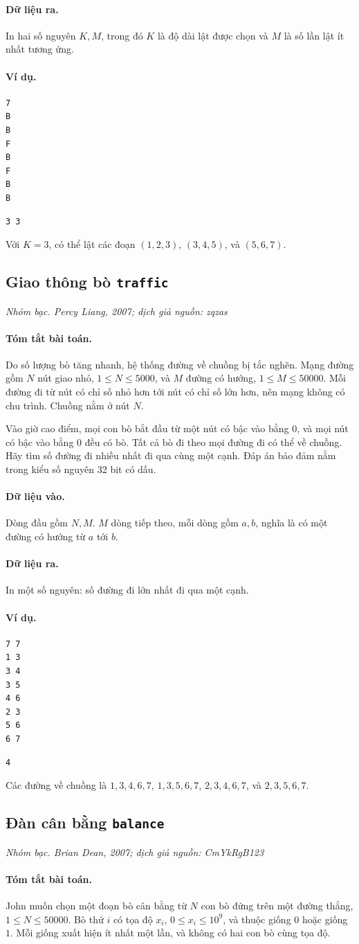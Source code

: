\documentclass[11pt]{article}
\newcommand{\problem}[4]{%
  \subsection[#1 (#2)]{#1 \hfill {\normalsize\texttt{#2}}}%
  \noindent\textit{#3. #4}\par\smallskip
}
\newcommand{\iosec}[1]{\paragraph{#1}}
\begin{document}
\iosec{Dữ liệu ra.}
In hai số nguyên \(K,M\), trong đó \(K\) là độ dài lật được chọn và \(M\) là
số lần lật ít nhất tương ứng.

\iosec{Ví dụ.}
\begin{verbatim}
7
B
B
F
B
F
B
B
\end{verbatim}

\begin{verbatim}
3 3
\end{verbatim}

Với \(K=3\), có thể lật các đoạn \((1,2,3)\), \((3,4,5)\), và \((5,6,7)\).

\problem{Giao thông bò}{traffic}{Nhóm bạc}{Percy Liang, 2007; dịch giả nguồn: zqzas}

\iosec{Tóm tắt bài toán.}
Do số lượng bò tăng nhanh, hệ thống đường về chuồng bị tắc nghẽn. Mạng đường
gồm \(N\) nút giao nhỏ, \(1\le N\le 5000\), và \(M\) đường có hướng,
\(1\le M\le 50000\). Mỗi đường đi từ nút có chỉ số nhỏ hơn tới nút có chỉ số
lớn hơn, nên mạng không có chu trình. Chuồng nằm ở nút \(N\).

Vào giờ cao điểm, mọi con bò bắt đầu từ một nút có bậc vào bằng \(0\), và mọi
nút có bậc vào bằng \(0\) đều có bò. Tất cả bò đi theo mọi đường đi có thể về
chuồng. Hãy tìm số đường đi nhiều nhất đi qua cùng một cạnh. Đáp án bảo đảm
nằm trong kiểu số nguyên 32 bit có dấu.

\iosec{Dữ liệu vào.}
Dòng đầu gồm \(N,M\). \(M\) dòng tiếp theo, mỗi dòng gồm \(a,b\), nghĩa là có
một đường có hướng từ \(a\) tới \(b\).

\iosec{Dữ liệu ra.}
In một số nguyên: số đường đi lớn nhất đi qua một cạnh.

\iosec{Ví dụ.}
\begin{verbatim}
7 7
1 3
3 4
3 5
4 6
2 3
5 6
6 7
\end{verbatim}

\begin{verbatim}
4
\end{verbatim}

Các đường về chuồng là \(1,3,4,6,7\), \(1,3,5,6,7\), \(2,3,4,6,7\), và
\(2,3,5,6,7\).

\problem{Đàn cân bằng}{balance}{Nhóm bạc}{Brian Dean, 2007; dịch giả nguồn: CmYkRgB123}

\iosec{Tóm tắt bài toán.}
John muốn chọn một đoạn bò cân bằng từ \(N\) con bò đứng trên một đường thẳng,
\(1\le N\le 50000\). Bò thứ \(i\) có tọa độ \(x_i\),
\(0\le x_i\le 10^9\), và thuộc giống \(0\) hoặc giống \(1\). Mỗi giống xuất
hiện ít nhất một lần, và không có hai con bò cùng tọa độ.
\end{document}
